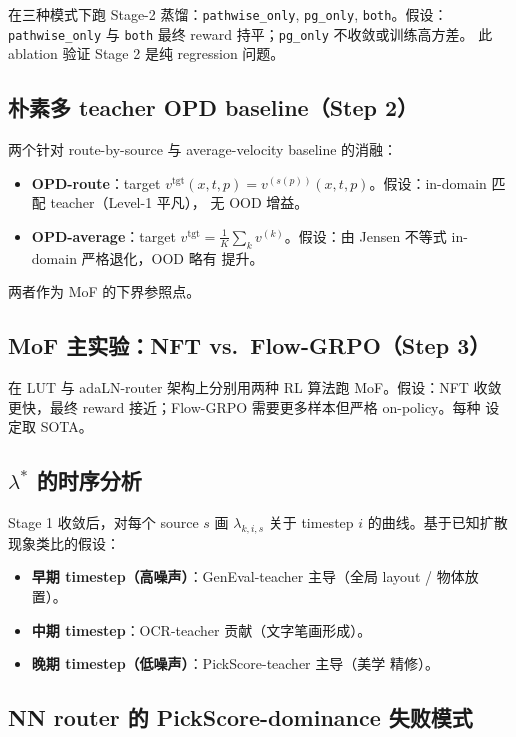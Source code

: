 \documentclass[11pt,a4paper]{article}
\theoremstyle{definition}
\begin{document}
在三种模式下跑 Stage-2 蒸馏：\texttt{pathwise\_only},
\texttt{pg\_only}, \texttt{both}。假设：\texttt{pathwise\_only} 与
\texttt{both} 最终 reward 持平；\texttt{pg\_only} 不收敛或训练高方差。
此 ablation 验证 Stage 2 是纯 regression 问题。

\subsection{朴素多 teacher OPD baseline（Step 2）}

两个针对 route-by-source 与 average-velocity baseline 的消融：
\begin{itemize}[leftmargin=1.5em]
\item \textbf{OPD-route}：target $v^{\mathrm{tgt}}(x, t, p) =
v^{(s(p))}(x, t, p)$。假设：in-domain 匹配 teacher（Level-1 平凡），
无 OOD 增益。
\item \textbf{OPD-average}：target $v^{\mathrm{tgt}} = \tfrac{1}{K}
\sum_k v^{(k)}$。假设：由 Jensen 不等式 in-domain 严格退化，OOD 略有
提升。
\end{itemize}
两者作为 MoF 的下界参照点。

\subsection{MoF 主实验：NFT vs.\ Flow-GRPO（Step 3）}

在 LUT 与 adaLN-router 架构上分别用两种 RL 算法跑 MoF。假设：NFT 收敛
更快，最终 reward 接近；Flow-GRPO 需要更多样本但严格 on-policy。每种
设定取 SOTA。

\subsection{$\lambda^*$ 的时序分析}

Stage 1 收敛后，对每个 source $s$ 画 $\lambda_{k, i, s}$ 关于 timestep
$i$ 的曲线。基于已知扩散现象类比的假设：
\begin{itemize}[leftmargin=1.5em]
\item \textbf{早期 timestep（高噪声）}：GenEval-teacher 主导（全局
layout / 物体放置）。
\item \textbf{中期 timestep}：OCR-teacher 贡献（文字笔画形成）。
\item \textbf{晚期 timestep（低噪声）}：PickScore-teacher 主导（美学
精修）。
\end{itemize}

\subsection{NN router 的 PickScore-dominance 失败模式}
\label{ssec:pickscore_dominance}
\end{document}
